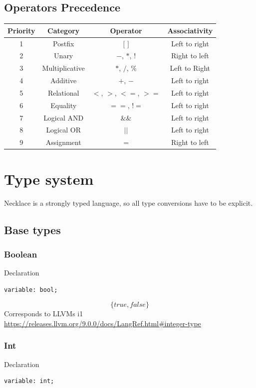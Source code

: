 \documentclass{article}
\begin{document}
\subsection{Operators Precedence}
\begin{center}
\begin{tabular}{||c | c | c |  c|}
 \hline
 Priority & Category & Operator & Associativity\\
 \hline
 1 & Postfix  & $[$ $]$ & Left to right \\  
 \hline
 2 & Unary & $-$, $*$, $!$ & Right to left    \\
  \hline
 3 & Multiplicative & $*$, $/$, $\%$ & Left to Right    \\
 \hline
 4 & Additive & $+$, $-$ & Left to right \\ 
 \hline
 5 & Relational	& $<$, $>$, $<=$, $>=$ & Left to right\\
 \hline
 6 & Equality & $==$, $!=$ & Left to right \\
 \hline
 7 & Logical AND & $\&\&$ & Left to right \\
 \hline
 8 & Logical OR & $||$ & Left to right \\
 \hline
 9 & Assignment & $=$ & Right to left \\
 \hline
\end{tabular}
\end{center}
\section{Type system}
Necklace is a strongly typed language, so all type conversions have to be explicit.
\subsection{Base types}
\subsubsection{Boolean}
Declaration 
\begin{verbatim}
variable: bool;
\end{verbatim}
$$
\{true, false\}
$$
Corresponds to LLVMs i1 \url{https://releases.llvm.org/9.0.0/docs/LangRef.html#integer-type}
\subsubsection{Int}
Declaration 
\begin{verbatim}
variable: int;
\end{verbatim}
\end{document}
